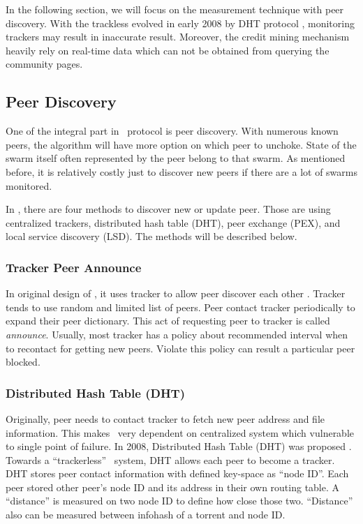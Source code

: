 In the following section, we will focus on the measurement technique with peer discovery. With the trackless \bt evolved in early 2008 by DHT protocol \cite{2008:dht:loewenstern}, monitoring trackers may result in inaccurate result. Moreover, the credit mining mechanism heavily rely on real-time data which can not be obtained from querying the community pages.

\subsection{Peer Discovery}
One of the integral part in \bt~protocol is peer discovery. With numerous known peers, the algorithm will have more option on which peer to unchoke. State of the swarm itself often represented by the peer belong to that swarm. As mentioned before, it is relatively costly just to discover new peers if there are a lot of swarms monitored. 

In \bt, there are four methods to discover new or update peer. Those are using centralized trackers, distributed hash table (DHT), peer exchange (PEX), and local service discovery (LSD). The methods will be described below.

\subsubsection{Tracker Peer Announce}
In original design of \bt, it uses tracker to allow peer discover each other \cite{2003:bittorrent:cohen}. Tracker tends to use random and limited list of peers. Peer contact tracker periodically to expand their peer dictionary. This act of requesting peer to tracker is called \textit{announce}.	Usually, most tracker has a policy about recommended interval when to recontact for getting new peers. Violate this policy can result a particular peer blocked.	
	
\subsubsection{Distributed Hash Table (DHT)}
Originally, peer needs to contact tracker to fetch new peer address and file information. This makes \bt~very dependent on centralized system which vulnerable to single point of failure. In 2008, Distributed Hash Table (DHT) was proposed \cite{2008:dht:loewenstern}. Towards a ``trackerless'' \bt~system, DHT allows each peer to become a tracker. DHT stores peer contact information with defined key-space as ``node ID''. Each peer stored other peer's node ID and its address in their own routing table. A ``distance'' is measured on two node ID to define how close those two. ``Distance'' also can be measured between infohash of a torrent and node ID.
	
